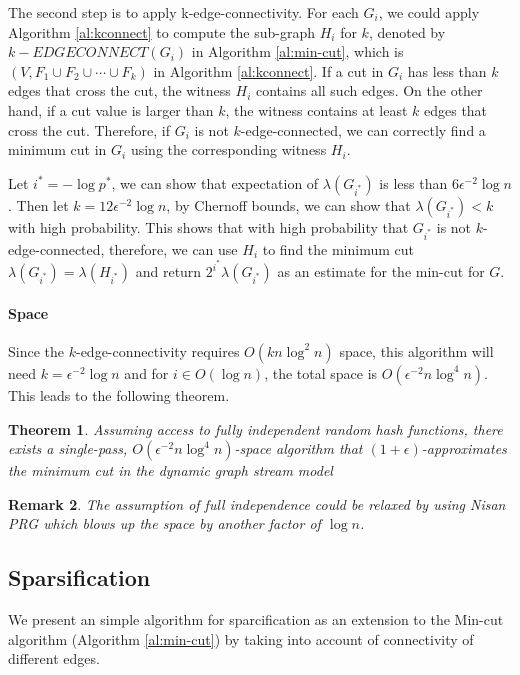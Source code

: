 \documentclass[11pt]{article}
\theoremstyle{plain}
\newtheorem{theorem}{Theorem}[section]
\newtheorem{remark}[theorem]{Remark}
\begin{document}
The second step is to apply k-edge-connectivity. For each $G_i$, we could 
apply Algorithm \ref{al:kconnect} to compute the sub-graph $H_i$ for $k$, 
denoted by $k-EDGECONNECT(G_i)$ in Algorithm \ref{al:min-cut}, which is 
$(V, F_1\cup F_2 \cup \cdots \cup F_k)$ in Algorithm \ref{al:kconnect}. 
If a cut in $G_i$ has less than $k$ edges that cross the cut, the
witness $H_i$ contains all such edges. On the other hand, if a cut value
is larger than $k$, the witness contains at least $k$ edges that cross the
cut. Therefore, if $G_i$ is not $k$-edge-connected, we can correctly find
a minimum cut in $G_i$ using the corresponding witness $H_i$.

Let $i^*=-\log p^*$, we can show that expectation of $\lambda(G_{i^*})$ is 
less than $6\epsilon^{-2}\log n$. Then let $k=12\epsilon^{-2}\log n$, by 
Chernoff 
bounds, we can show that $\lambda(G_{i^*})<k$ with high probability. This 
shows that with high probability that $G_{i^*}$ is not $k$-edge-connected, 
therefore, we can use $H_i$ to find the minimum cut 
$\lambda(G_{i^*})=\lambda(H_{i^*})$ and return $2^{i^*}\lambda(G_{i^*})$ as 
an 
estimate for the min-cut for $G$.

\paragraph{Space} Since the $k$-edge-connectivity requires $O(kn\log^2 
n)$ space, this algorithm will need $k=\epsilon^{-2}\log n$ and for $i\in O(\log 
n)$, the total space is $O(\epsilon^{-2}n\log^4 n)$. This leads to the 
following theorem. 

\begin{theorem}
Assuming access to fully independent random hash functions, there exists a 
single-pass, $O(\epsilon^{-2}n\log^4 n)$-space
algorithm that $(1 + \epsilon)$-approximates the minimum cut in the dynamic
graph stream model
\end{theorem}

\begin{remark}
	The assumption of full independence could be relaxed by using Nisan PRG 
	which blows up the space by another factor of $\log n$. 
\end{remark}



\subsection{Sparsification}
We present an simple algorithm for sparcification as an extension to the 
Min-cut algorithm (Algorithm \ref{al:min-cut}) by taking into account of 
connectivity of different edges. 
\end{document}
